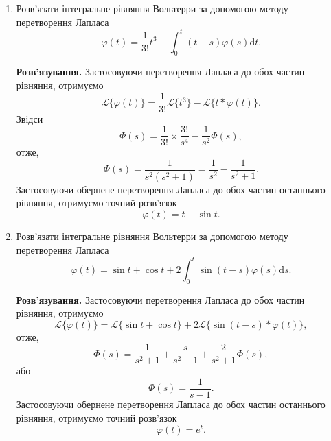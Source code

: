 \documentclass[14pt,twoside]{extreport}
\theoremstyle{mystyle}
\numberwithin{equation}{chapter}
\begin{document}
\begin{small}
\begin{enumerate}
		\item Розв'язати інтегральне рівняння Вольтерри за допомогою методу перетворення Лапласа
		\begin{equation*}
			\varphi(t)=\displaystyle \frac{1}{3!}t^{3}-\int_{0}^{t}(t-s)\varphi(s)\mathrm{d}t.
		\end{equation*}
		
		\textbf{Розв'язування.}
		Застосовуючи перетворення Лапласа до обох частин рівняння, отримуємо
		\begin{equation*}
			\displaystyle \mathcal{L}\{\varphi(t)\}=\frac{1}{3!}\mathcal{L}\{t^{3}\}-\mathcal{L}\{t*\varphi(t)\}.
		\end{equation*}
		Звідси
		\begin{equation*}
			\Phi(s)=\displaystyle \frac{1}{3!}\times\frac{3!}{s^{4}}-\frac{1}{s^{2}}\Phi(s),
		\end{equation*}
		отже,
		\begin{equation*}
			\Phi(s)=\displaystyle \frac{1}{s^{2}(s^{2}+1)}=\frac{1}{s^{2}}-\frac{1}{s^{2}+1}.
		\end{equation*}
		Застосовуючи обернене перетворення Лапласа до обох частин останнього рівняння, отримуємо точний розв'язок
		\begin{equation*}
			\varphi(t)=t-\sin t.
		\end{equation*}
		
		\item Розв'язати інтегральне рівняння Вольтерри за допомогою методу перетворення Лапласа
		\begin{equation*}
			\varphi(t)=\displaystyle \sin t+\cos t+2\int_{0}^{t}\sin(t-s)\varphi(s)\mathrm{d}s.
		\end{equation*}
		
		\textbf{Розв'язування.}
		Застосовуючи перетворення Лапласа до обох частин рівняння, отримуємо
		\begin{equation*}
			\mathcal{L}\{\varphi(t)\}=\mathcal{L}\{\sin t+\cos t\}+2\mathcal{L}\{\sin(t-s)*\varphi(t)\},
		\end{equation*}
		отже,
		\begin{equation*}
			\Phi(s)=\displaystyle \frac{1}{s^{2}+1}+\frac{s}{s^{2}+1}+\frac{2}{s^{2}+1}\Phi(s),
		\end{equation*}
		або
		\begin{equation*}
			\Phi(s)=\displaystyle \frac{1}{s-1}.
		\end{equation*}
		Застосовуючи обернене перетворення Лапласа до обох частин останнього рівняння, отримуємо точний розв'язок
		\begin{equation*}
			\varphi(t)=e^{t}.
		\end{equation*}
	\end{enumerate}
\end{small}
\end{document}
